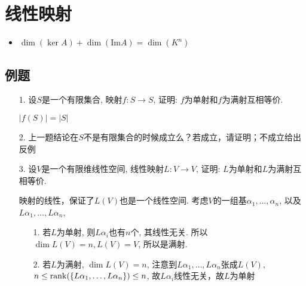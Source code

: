 
\section{线性映射}
\begin{itemize}
\item $\dim(\ker A) + \dim(\mathrm{Im} A) = \dim(K^n)$
\end{itemize}

\subsection*{例题}
\begin{itemize}
	\item[1.] 设$S$是一个有限集合, 映射$f:S \rightarrow S$,
	证明: $f$为单射和$f$为满射互相等价.
	\begin{solution}
		$|f(S)| = |S|$
	\end{solution}
	\vspace{1cm}

	\item[2.] 上一题结论在$S$不是有限集合的时候成立么？若成立，请证明；不成立给出反例
	\vspace{1cm}

	\item[3.] 设$V$是一个有限维线性空间, 线性映射$L:V \rightarrow V$,
	证明: $L$为单射和$L$为满射互相等价.
	\begin{solution}
		映射的线性，保证了$L(V)$也是一个线性空间.
		考虑$V$的一组基$\alpha_1,\dots,\alpha_n$, 以及$L\alpha_1, \dots, L\alpha_n$,
		\begin{enumerate}
		\item [1.] 若$L$为单射, 则$L\alpha_i$也有$n$个, 其线性无关. 所以$\dim L(V) = n, L(V) = V$, 所以是满射. 
		\item [2.] 若$L$为满射, $\dim L(V) = n$, 注意到$L\alpha_1, \dots, L\alpha_n$张成$L(V)$,
		$n \le \mathrm{rank}(\{ L\alpha_1,\dots,L\alpha_n\}) \le n$, 
		故$L\alpha_i$线性无关，故$L$为单射
		\end{enumerate}
	\end{solution}
	\vspace{2cm}

\end{itemize}